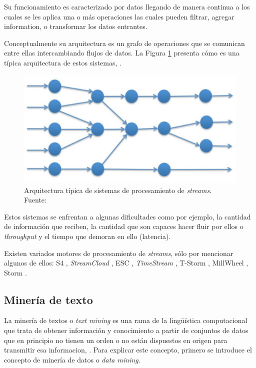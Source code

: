Su funcionamiento es caracterizado por datos llegando de manera continua a los cuales se les aplica una o más operaciones las cuales pueden filtrar, agregar information, o transformar los datos entrantes.

Conceptualmente su arquitectura es un grafo de operaciones que se comunican entre ellas intercambiando flujos de datos. La Figura \ref{fig:ArqSPS} presenta cómo es una típica arquitectura de estos sistemas, \cite{SPExplained}.

\begin{figure}[H]
	\centering
	\captionsetup{justification=centering}
	\includegraphics[scale=0.8]{images/ArqSPS.png}
	\caption[Arquitectura típica de sistemas de procesamiento de \textit{streams}.]{Arquitectura típica de sistemas de procesamiento de \textit{streams}.\\Fuente: \cite{SPExplained}}
	\label{fig:ArqSPS}
\end{figure}

Estos sistemas se enfrentan a algunas dificultades como por ejemplo, la cantidad de información que reciben, la cantidad que son capaces hacer fluir por ellos o \textit{throughput} y el tiempo que demoran en ello (latencia).

Existen variados motores de procesamiento de \textit{streams}, sólo por mencionar algunos de ellos: S4 \cite{NeumeyerS4}, \textit{StreamCloud} \cite{GulisanoStreamCloud}, ESC \cite{SatzgerESC}, \textit{TimeStream} \cite{QianTimeStream}, T-Storm \cite{XuTStorm}, MillWheel \cite{AkidauMillWheel}, Storm \cite{StormFigure}.


\subsection{Minería de texto}
\label{subsec:MineriaTexto}

La minería de textos o \textit{text mining} es una rama de la lingüística computacional que trata de obtener información y conocimiento a partir de conjuntos de datos que en principio no tienen un orden o no están dispuestos en origen para transmitir esa informacion, \cite{IvanFernandez}. Para explicar este concepto, primero se introduce el concepto de minería de datos o \textit{data mining}.

